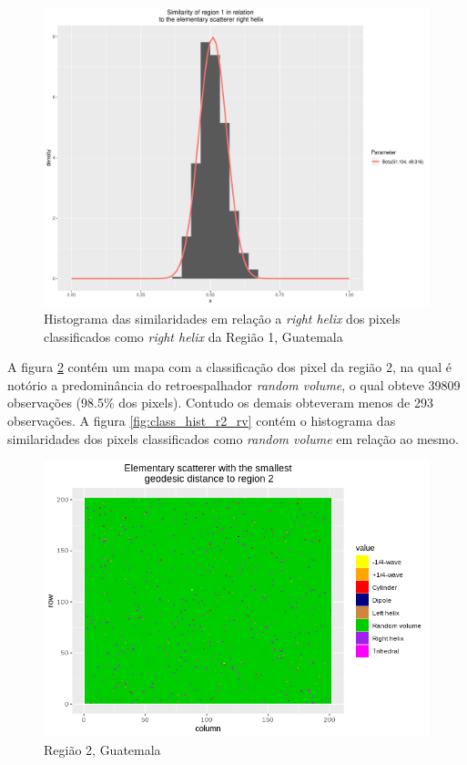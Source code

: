 \documentclass[12pt]{article}
\begin{document}
\begin{figure}[!h]
    \centering    
    \includegraphics[width = 0.85\linewidth]{../../Images/Report_18_12_20/Classifier_Geo_Dist/Histograms/Guate/region1_rh_sm_filter.pdf}
    \caption{Histograma das similaridades em relação a \textit{right helix} dos pixels classificados como \textit{right helix} da Região 1, Guatemala}
    \label{fig:class_hist_r1_rh}
\end{figure}

\newpage

A figura \ref{fig:class_map_r2} contém um mapa com a classificação dos pixel da região 2, na qual é notório a predominância do retroespalhador \textit{random volume}, o qual obteve 39809 observações (98.5\% dos pixels). Contudo os demais obteveram menos de 293 observações. A figura \ref{fig:class_hist_r2_rv} contém o histograma das similaridades dos pixels classificados como \textit{random volume} em relação ao mesmo.

\begin{figure}[!h]
    \centering    
    \includegraphics[width = 0.85\linewidth]{../../Images/Report_18_12_20/Classifier_Geo_Dist/Class_Map/Guate/region2_predomain.png}
    \caption{Região 2, Guatemala}
    \label{fig:class_map_r2}
\end{figure}
\end{document}
